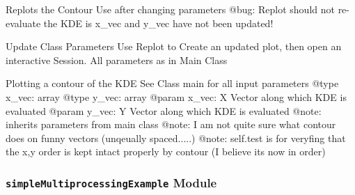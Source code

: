 \documentclass[letterpaper,10pt,english]{sphinxmanual}
\begin{document}
\begin{fulllineitems}
\begin{fulllineitems}
\end{fulllineitems}



\begin{fulllineitems}
\label{SamPy.sandbox:SamPy.sandbox.MyTools.AnaKDE.RePlot}
Replots the Contour
Use after changing parameters
@bug: Replot should not re-evaluate the KDE is x\_vec and y\_vec have not been updated!

\end{fulllineitems}



\begin{fulllineitems}
\label{SamPy.sandbox:SamPy.sandbox.MyTools.AnaKDE.Update}
Update Class Parameters
Use Replot to Create an updated plot, then open an interactive Session.
All parameters as in Main Class

\end{fulllineitems}



\begin{fulllineitems}
\label{SamPy.sandbox:SamPy.sandbox.MyTools.AnaKDE.contour}
Plotting a contour of the KDE
See Class main for all input parameters
@type x\_vec: array
@type y\_vec: array
@param x\_vec: X Vector along which KDE is evaluated
@param y\_vec: Y Vector along which KDE is evaluated
@note: inherits parameters from main class 
@note: I am not quite sure what contour does on funny vectors (unqeually spaced.....)
@note: self.test is for veryfing that the x,y order is kept intact properly by contour (I believe its now in order)

\end{fulllineitems}


\end{fulllineitems}



\subsubsection{\texttt{simpleMultiprocessingExample} Module}
\label{SamPy.sandbox:simplemultiprocessingexample-module}\label{SamPy.sandbox:module-SamPy.sandbox.simpleMultiprocessingExample}
\end{document}
